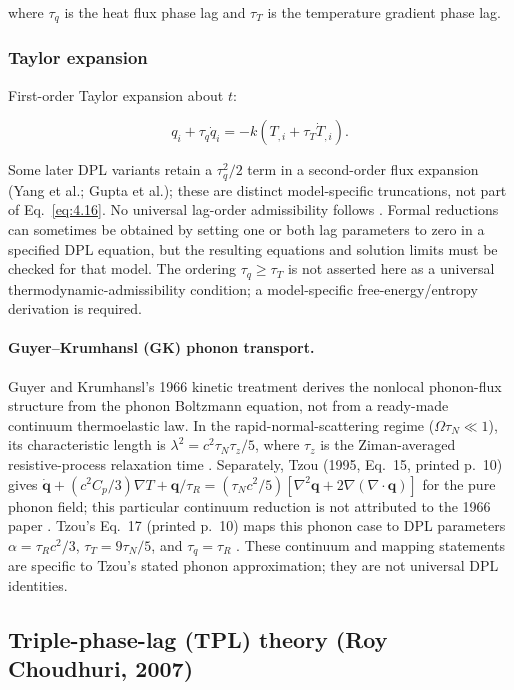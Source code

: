 where $\tau_q$ is the heat flux phase lag and $\tau_T$ is the temperature gradient phase lag.

\subsubsection{Taylor expansion}

First-order Taylor expansion about $t$:

\begin{equation}
q_i + \tau_q\dot{q}_i = -k(T_{,i} + \tau_T\dot{T}_{,i}).
\label{eq:4.16}
\end{equation}

Some later DPL variants retain a $\tau_q^2/2$ term in a second-order flux expansion (Yang et al.; Gupta et al.); these are distinct model-specific truncations, not part of Eq.~\eqref{eq:4.16}. No universal lag-order admissibility follows \cite{Yang2021,Gupta2023}. Formal reductions can sometimes be obtained by setting one or both lag parameters to zero in a specified DPL equation, but the resulting equations and solution limits must be checked for that model. The ordering $\tau_q\geq\tau_T$ is not asserted here as a universal thermodynamic-admissibility condition; a model-specific free-energy/entropy derivation is required.

\paragraph{Guyer--Krumhansl (GK) phonon transport.}

Guyer and Krumhansl's 1966 kinetic treatment derives the nonlocal phonon-flux structure from the phonon Boltzmann equation, not from a ready-made continuum thermoelastic law. In the rapid-normal-scattering regime ($\Omega\tau_N\ll1$), its characteristic length is $\lambda^2=c^2\tau_N\tau_z/5$, where $\tau_z$ is the Ziman-averaged resistive-process relaxation time \cite{GuyerKrumhansl1966}. Separately, Tzou (1995, Eq.~15, printed p.~10) gives $\dot{\bm q}+(c^2C_p/3)\nabla T+\bm q/\tau_R=(\tau_Nc^2/5)[\nabla^2\bm q+2\nabla(\nabla\cdot\bm q)]$ for the pure phonon field; this particular continuum reduction is not attributed to the 1966 paper \cite{Tzou1995}. Tzou's Eq.~17 (printed p.~10) maps this phonon case to DPL parameters $\alpha=\tau_Rc^2/3$, $\tau_T=9\tau_N/5$, and $\tau_q=\tau_R$ \cite{Tzou1995}. These continuum and mapping statements are specific to Tzou's stated phonon approximation; they are not universal DPL identities.

\subsection{Triple-phase-lag (TPL) theory (Roy Choudhuri, 2007)}
\label{sec:4.8}

